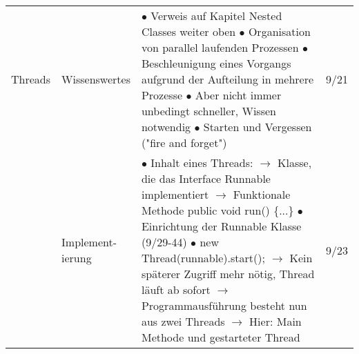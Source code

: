 \documentclass[11pt,a4paper]{article}
\begin{document}
\begin{center}
\begin{longtable}[h]{ | p{2.3cm} | p{2.3cm} | p{12.6cm} | p{1.2cm} | }
	
	
	{\large Threads } & Wissenswertes & \makecell[l]{$\bullet$ Verweis auf Kapitel Nested Classes weiter oben \\
	$\bullet$ Organisation von parallel laufenden Prozessen \\
	$\bullet$ Beschleunigung eines Vorgangs aufgrund der Aufteilung in mehrere Prozesse \\
	$\bullet$ Aber nicht immer unbedingt schneller, Wissen notwendig\\
	$\bullet$ Starten und Vergessen ("fire and forget")} & 9/21 \\ \cline{2-4}
	
	& \makecell[l]{Implement- \\ ierung} & \makecell[l]{$\bullet$ Inhalt eines Threads: \\
	\hspace{0.4cm} $\rightarrow$ Klasse, die das Interface Runnable implementiert\\
	\hspace{0.4cm} $\rightarrow$ Funktionale Methode public void run() \{...\} \\
	$\bullet$ Einrichtung der Runnable Klasse (9/29-44) \\
	$\bullet$ new Thread(runnable).start(); \\
	\hspace{0.4cm} $\rightarrow$ Kein späterer Zugriff mehr nötig, Thread läuft ab sofort \\
	\hspace{0.4cm} $\rightarrow$ Programmausführung besteht nun aus zwei Threads\\
	\hspace{0.4cm} $\rightarrow$ Hier: Main Methode und gestarteter Thread  }  & 9/23 \\ \cline{2-4}
	

\end{longtable}
\end{center}
\end{document}
